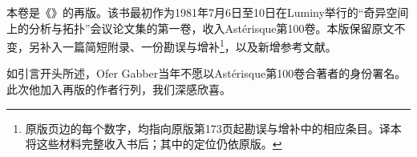本卷是《》的再版。该书最初作为1981年7月6日至10日在Luminy举行的“奇异空间上的分析与拓扑”会议论文集的第一卷，收入Astérisque第100卷。本版保留原文不变，另补入一篇简短附录、一份勘误与增补\footnote{原版页边的每个数字，均指向原版第173页起勘误与增补中的相应条目。译本将这些材料完整收入书后；其中的定位仍依原版。}，以及新增参考文献。

如引言开头所述，Ofer Gabber当年不愿以Astérisque第100卷合著者的身份署名。此次他加入再版的作者行列，我们深感欣喜。
